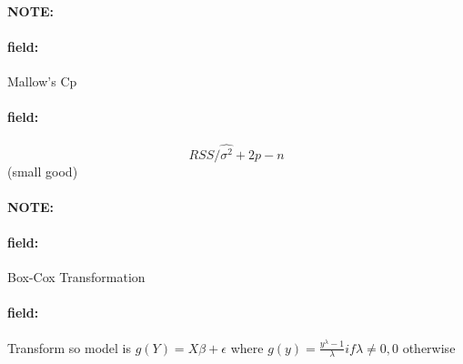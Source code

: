 \documentclass[12pt]{article}
\newenvironment{note}{\paragraph{NOTE:}}{}
\newenvironment{field}{\paragraph{field:}}{}
\begin{document}
\begin{note}
  \begin{field}
    Mallow's Cp
  \end{field}
  \begin{field}
    $$ RSS/\hat{\sigma^2} + 2p - n $$ (small good)
  \end{field}
\end{note}

\begin{note}
  \begin{field}
    Box-Cox Transformation
  \end{field}
  \begin{field}
    Transform so model is $g(Y) = X\beta + \epsilon$
    where $g(y) = \frac{y^\lambda -1}{\lambda} if \lambda \neq 0, 0 $ otherwise
  \end{field}
\end{note}


\end{document}
